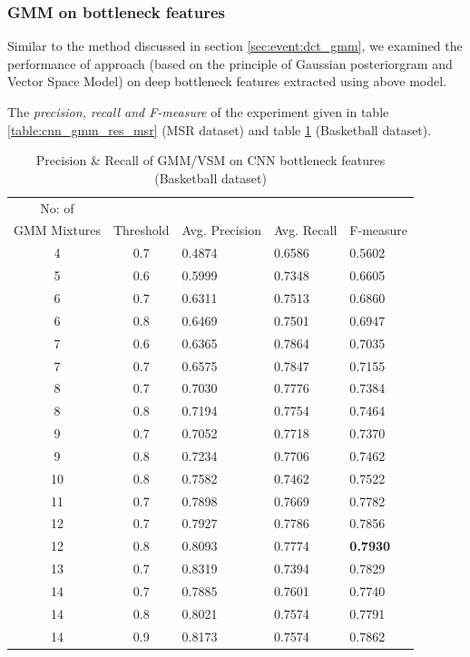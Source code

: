 \subsubsection{GMM on bottleneck features}
Similar to the method discussed in section \ref{sec:event:dct_gmm}, we examined the performance of approach (based on the principle of Gaussian posteriorgram and Vector Space Model) on deep bottleneck features extracted using above model. 

The \textit{precision, recall and F-measure} of the experiment given in table \ref{table:cnn_gmm_res_msr} (MSR dataset) and table \ref{table:cnn_gmm_res_basket} (Basketball dataset).

\begin{table}[h]
\centering
\begin{tabular}{|c|c|l|l|l|}
\hline
No: of &&&&\\
GMM Mixtures & Threshold & Avg. Precision & Avg. Recall & F-measure\\
\hline
\hline
4 	&0.7 	&0.4874 	& 0.6586	&0.5602\\
5 	&0.6 	&0.5999 	& 0.7348	&0.6605\\
6 	&0.7 	&0.6311 	& 0.7513	&0.6860\\
6 	&0.8 	&0.6469 	& 0.7501	&0.6947\\
7 	&0.6 	&0.6365 	& 0.7864	&0.7035\\
7 	&0.7 	&0.6575 	& 0.7847	&0.7155\\
8 	&0.7 	&0.7030 	& 0.7776	&0.7384\\
8 	&0.8 	&0.7194 	& 0.7754	&0.7464\\
9 	&0.7 	&0.7052 	& 0.7718	&0.7370\\
9 	&0.8 	&0.7234 	& 0.7706	&0.7462\\
10 	&0.8 	&0.7582 	& 0.7462	&0.7522\\
11 	&0.7 	&0.7898 	& 0.7669	&0.7782\\
12 	&0.7 	&0.7927 	& 0.7786	&0.7856\\
12 	&0.8 	&0.8093 	& 0.7774	&\textbf{0.7930}\\
13 	&0.7 	&0.8319 	& 0.7394	&0.7829\\
14 	&0.7 	&0.7885 	& 0.7601	&0.7740\\
14 	&0.8 	&0.8021 	& 0.7574	&0.7791\\
14 	&0.9 	&0.8173 	& 0.7574	&0.7862\\
\hline  
\end{tabular}
\caption[Event spotting using GMM/VSM on CNN(Gray,Frame diff,Edge) bottleneck features (MSR Action Dataset) ]{ Precision \& Recall  of GMM/VSM on CNN bottleneck features (Basketball dataset)}
\label{table:cnn_gmm_res_basket}
\end{table}
\pagebreak
